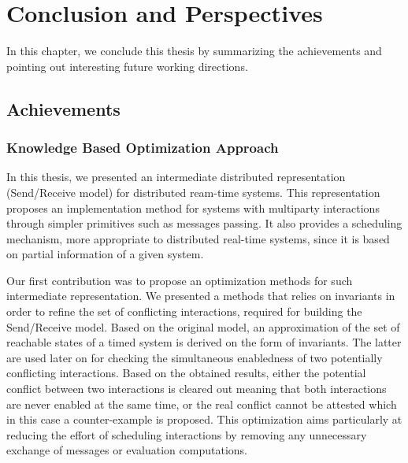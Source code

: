 \chapter{Conclusion and Perspectives}
\label{chap:9}
In this chapter, we conclude this thesis by summarizing the achievements and pointing out
interesting future working directions.  

\section{Achievements}
\subsection*{Knowledge Based Optimization Approach}
In this thesis, we presented an intermediate distributed representation (Send/Receive model) for 
distributed ream-time systems. This representation proposes an implementation method for
systems with multiparty interactions through simpler primitives such as
messages passing. It also provides a scheduling mechanism, more appropriate to distributed
real-time systems, since it is based on partial information of a given system.

Our first contribution was to propose an optimization methods for such intermediate 
representation. We presented a methods that relies on invariants in order to refine the
set of conflicting interactions, required for building the Send/Receive model.
Based on the original model, an approximation of the set of reachable states of a timed system
is derived on the form of invariants. The latter are used later on for checking the 
simultaneous enabledness of two potentially conflicting interactions. 
Based on the obtained results, either the potential conflict between two interactions is cleared 
out meaning that both interactions are never enabled at the same time, or the real conflict 
cannot be attested which in this case a counter-example is proposed.
This optimization aims particularly at reducing the effort of scheduling interactions
by removing any unnecessary exchange of messages or evaluation computations. 

